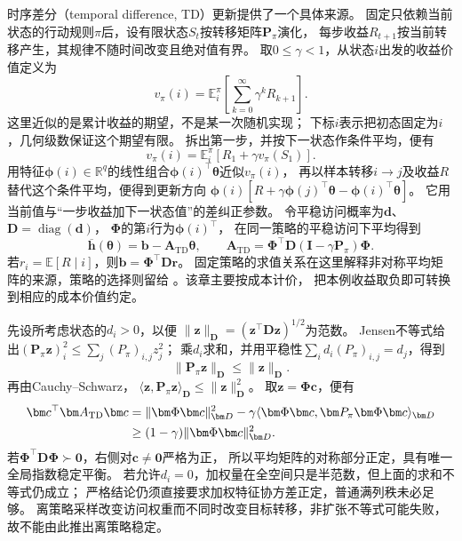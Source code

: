 时序差分（temporal difference, TD）更新提供了一个具体来源。
固定只依赖当前状态的行动规则$\pi$后，设有限状态$S_t$按转移矩阵$\bm P_\pi$演化，
每步收益$R_{t+1}$按当前转移产生，其规律不随时间改变且绝对值有界。
取$0\leq\gamma<1$，从状态$i$出发的收益价值定义为
\[
 v_\pi(i)=\mathbb E_i^\pi
 \left[\sum_{k=0}^\infty\gamma^kR_{k+1}\right].
\]
这里近似的是累计收益的期望，不是某一次随机实现；
下标$i$表示把初态固定为$i$，几何级数保证这个期望有限。
拆出第一步，并按下一状态作条件平均，便有
\[
 v_\pi(i)=\mathbb E_i^\pi[R_1+\gamma v_\pi(S_1)].
\]
用特征$\bm\phi(i)\in\mathbb R^q$的线性组合$\bm\phi(i)^\top\bm\theta$近似$v_\pi(i)$，
再以样本转移$i\to j$及收益$R$替代这个条件平均，便得到更新方向
$\bm\phi(i)[R+\gamma\bm\phi(j)^\top\bm\theta-\bm\phi(i)^\top\bm\theta]$。
它用当前值与“一步收益加下一状态值”的差纠正参数。
令平稳访问概率为$\bm d$、$\bm D=\operatorname{diag}(\bm d)$，
$\bm\Phi$的第$i$行为$\bm\phi(i)^\top$，
在同一策略的平稳访问下平均得到
\begin{equation}
  \overline{\bm h}(\bm\theta)=\bm b-\bm A_{\mathrm{TD}}\bm\theta,\qquad
  \bm A_{\mathrm{TD}}=\bm\Phi^\top\bm D
                    (\bm I-\gamma\bm P_\pi)\bm\Phi.
  \label{eq:dynamical-td-mean-matrix}
\end{equation}
若$r_i=\mathbb E[R\mid i]$，则$\bm b=\bm\Phi^\top\bm D\bm r$。
固定策略的求值关系在这里解释非对称平均矩阵的来源，策略的选择则留给
。该章主要按成本计价，
把本例收益取负即可转换到相应的成本价值约定。

先设所考虑状态的$d_i>0$，以便
$\|\bm z\|_{\bm D}=(\bm z^\top\bm D\bm z)^{1/2}$为范数。
Jensen不等式给出$(\bm P_\pi\bm z)_i^2\leq\sum_j(P_\pi)_{i,j}z_j^2$；
乘$d_i$求和，并用平稳性$\sum_id_i(P_\pi)_{i,j}=d_j$，得到
\begin{equation}
  \|\bm P_\pi\bm z\|_{\bm D}\leq\|\bm z\|_{\bm D}.
  \label{eq:dynamical-markov-contraction-weighted}
\end{equation}
再由Cauchy--Schwarz，
$\langle\bm z,\bm P_\pi\bm z\rangle_{\bm D}\leq\|\bm z\|_{\bm D}^2$。
取$\bm z=\bm\Phi\bm c$，便有
\begin{align}
  \bm c^\top\bm A_{\mathrm{TD}}\bm c
    &=\|\bm\Phi\bm c\|_{\bm D}^2
       -\gamma\langle\bm\Phi\bm c,\bm P_\pi\bm\Phi\bm c\rangle_{\bm D}\notag\\
    &\geq(1-\gamma)\|\bm\Phi\bm c\|_{\bm D}^2.
    \label{eq:dynamical-td-positive-drift}
\end{align}
若$\bm\Phi^\top\bm D\bm\Phi\succ\bm0$，右侧对$\bm c\neq\bm0$严格为正，
所以平均矩阵的对称部分正定，具有唯一全局指数稳定平衡。
若允许$d_i=0$，加权量在全空间只是半范数，但上面的求和不等式仍成立；
严格结论仍须直接要求加权特征协方差正定，普通满列秩未必足够。
离策略采样改变访问权重而不同时改变目标转移，非扩张不等式可能失败，
故不能由此推出离策略稳定。

